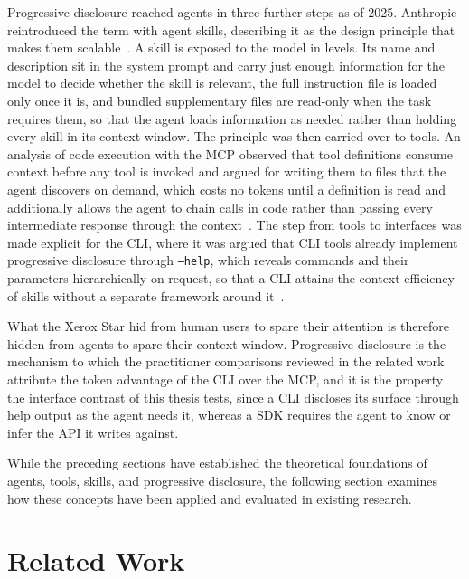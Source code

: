 \documentclass[
english,                 %
bibtex,                  %
]{kththesis}
\numberwithin{listing}{chapter}
\begin{document}
Progressive disclosure reached agents in three further steps as of 2025. Anthropic reintroduced the term with agent skills, describing it as the design principle that makes them scalable~\cite{anthropic_pbc_equipping_2025}. A skill is exposed to the model in levels. Its name and description sit in the system prompt and carry just enough information for the model to decide whether the skill is relevant, the full instruction file is loaded only once it is, and bundled supplementary files are read-only when the task requires them, so that the agent loads information as needed rather than holding every skill in its context window. The principle was then carried over to tools. An analysis of code execution with the \gls{MCP} observed that tool definitions consume context before any tool is invoked and argued for writing them to files that the agent discovers on demand, which costs no tokens until a definition is read and additionally allows the agent to chain calls in code rather than passing every intermediate response through the context~\cite{willison_code_2025}. The step from tools to interfaces was made explicit for the \gls{CLI}, where it was argued that \gls{CLI} tools already implement progressive disclosure through \texttt{--help}, which reveals commands and their parameters hierarchically on request, so that a \gls{CLI} attains the context efficiency of skills without a separate framework around it~\cite{musistudio_progressive_2026}.

What the Xerox Star hid from human users to spare their attention is therefore hidden from agents to spare their context window. Progressive disclosure is the mechanism to which the practitioner comparisons reviewed in the related work attribute the token advantage of the \gls{CLI} over the \gls{MCP}, and it is the property the interface contrast of this thesis tests, since a \gls{CLI} discloses its surface through help output as the agent needs it, whereas a \gls{SDK} requires the agent to know or infer the \gls{API} it writes against.

While the preceding sections have established the theoretical foundations of agents, tools, skills, and progressive disclosure, the following section examines how these concepts have been applied and evaluated in existing research.

\section{Related Work}
\label{sec:bg_related_work}
\glsresetall
\end{document}

